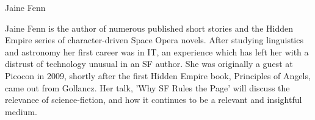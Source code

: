 {\Large Jaine Fenn}

\begin{figure}
	\vspace{-10mm}
	\vspace{-10mm}
\end{figure}

Jaine Fenn is the author of numerous published short stories and the Hidden Empire series of character-driven Space Opera novels. After studying linguistics and astronomy her first career was in IT, an experience which has left her with a distrust of technology unusual in an SF author. She was originally a guest at Picocon in 2009, shortly after the first Hidden Empire book, Principles of Angels, came out from Gollancz. Her talk, 'Why SF Rules the Page' will discuss the relevance of science-fiction, and how it continues to be a relevant and insightful medium.